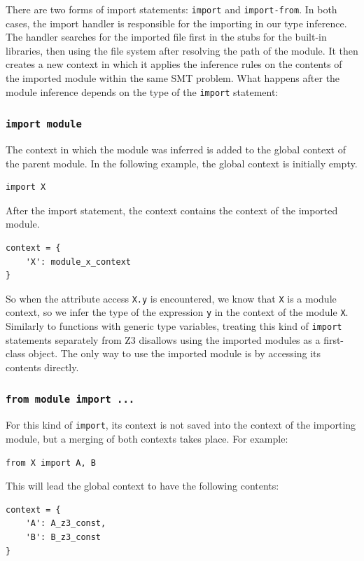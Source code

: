 There are two forms of import statements: \lstinline|import| and \lstinline|import-from|. In both cases, the import handler is responsible for the importing in our type inference. The handler searches for the imported file first in the stubs for the built-in libraries, then using the file system after resolving the path of the module. It then creates a new context in which it applies the inference rules on the contents of the imported module within the same SMT problem. What happens after the module inference depends on the type of the \lstinline|import| statement:

\subsubsection{\lstinline|import module|}
The context in which the module was inferred is added to the global context of the parent module. In the following example, the global context is initially empty.

\begin{lstlisting}
import X
\end{lstlisting}

After the import statement, the context contains the context of the imported module.

\begin{lstlisting}
context = {
	'X': module_x_context
}
\end{lstlisting}
So when the attribute access \lstinline|X.y| is encountered, we know that \lstinline|X| is a module context, so we infer the type of the expression \lstinline|y| in the context of the module \lstinline|X|. \\

Similarly to functions with generic type variables, treating this kind of \lstinline|import| statements separately from Z3 disallows using the imported modules as a first-class object. The only way to use the imported module is by accessing its contents directly.

\subsubsection{\lstinline|from module import ...|} 
For this kind of \lstinline|import|, its context is not saved into the context of the importing module, but a merging of both contexts takes place. For example:
\begin{lstlisting}
from X import A, B
\end{lstlisting}
This will lead the global context to have the following contents:
\begin{lstlisting}
context = {
	'A': A_z3_const,
	'B': B_z3_const
}
\end{lstlisting}

